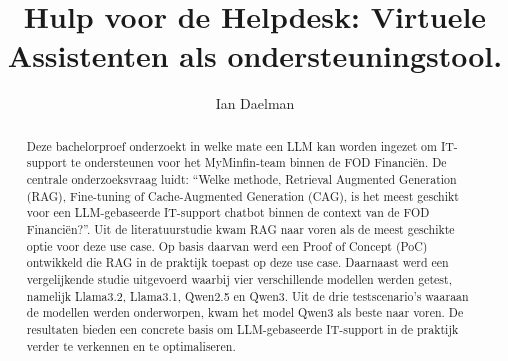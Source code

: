 \documentclass[a0,portrait]{hogent-poster}
\title{Hulp voor de Helpdesk: Virtuele Assistenten als ondersteuningstool.}
\author{Ian Daelman}
\begin{document}
\maketitle

\begin{abstract}
Deze bachelorproef onderzoekt in welke mate een LLM kan worden ingezet om IT-support te ondersteunen voor het MyMinfin-team binnen de FOD Financiën. De centrale onderzoeksvraag luidt: “Welke methode, Retrieval Augmented Generation (RAG), Fine-tuning of Cache-Augmented Generation (CAG), is het meest geschikt voor een LLM-gebaseerde IT-support chatbot binnen de context van de FOD Financiën?”. Uit de literatuurstudie kwam RAG naar voren als de meest geschikte optie voor deze use case. Op basis daarvan werd een Proof of Concept (PoC) ontwikkeld die RAG in de praktijk toepast op deze use case. Daarnaast werd een vergelijkende studie uitgevoerd waarbij vier verschillende modellen werden getest, namelijk Llama3.2, Llama3.1, Qwen2.5 en Qwen3. Uit de drie testscenario’s waaraan de modellen werden onderworpen, kwam het model Qwen3 als beste naar voren. De resultaten bieden een concrete basis om LLM-gebaseerde IT-support in de praktijk verder te verkennen en te optimaliseren.
\end{abstract}
\end{document}
